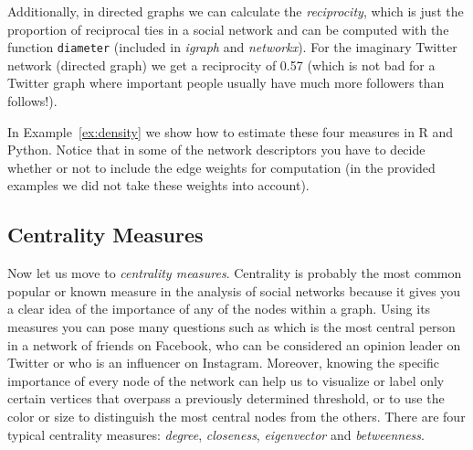 Additionally, in directed graphs we can calculate the \emph{reciprocity}, which is just the proportion of reciprocal ties in a social network and can be computed with the function \texttt{diameter} (included in \emph{igraph} and \emph{networkx}). For the imaginary Twitter network (directed graph) we get a reciprocity of 0.57 (which is not bad for a Twitter graph where important people usually have much more followers than follows!).

In Example~\ref{ex:density} we show how to estimate these four measures in R and Python. Notice that in some of the network descriptors you have to decide whether or not to include the edge weights for computation (in the provided examples we did not take these weights into account).


\subsection{Centrality Measures}\label{sec:centrality}

Now let us move to \emph{centrality measures}. Centrality is probably the most common popular or known measure in the analysis of social networks because it gives you a clear idea of the importance of any of the nodes within a graph. Using its measures you can pose many questions such as which is the most central person in a network of friends on Facebook, who can be considered an opinion leader on Twitter or who is an influencer on Instagram. Moreover, knowing the specific importance of every node of the network can help us to visualize or label only certain vertices that overpass a previously determined threshold, or to use the color or size to distinguish the most central nodes from the others. There are four typical centrality measures: \emph{degree}, \emph{closeness}, \emph{eigenvector} and \emph{betweenness}.

